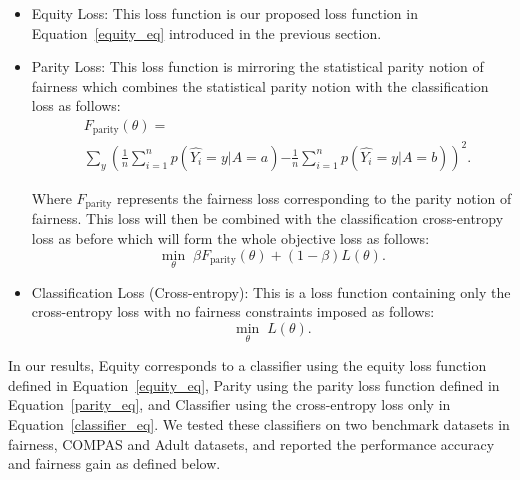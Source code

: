 \begin{itemize}
    \item Equity Loss: This loss function is our proposed loss function in Equation~\ref{equity_eq} introduced in the previous section.
    \item Parity Loss: This loss function is mirroring the statistical parity notion of fairness which combines the statistical parity notion with the classification loss as follows: 
    \begin{align*}
    &F_\text{parity}(\theta)=\\
    &\sum_{y}\left(\frac{1}{n}\sum_{i=1}^{n}p(\hat{Y_i}=y|A=a) \right. 
    \left.-\frac{1}{n}\sum_{i=1}^{n}p(\hat{Y_i}=y|A=b)\right)^2.
    \end{align*}

    Where $F_\text{parity}$ represents the fairness loss corresponding to the parity notion of fairness. This loss will then be combined with the classification cross-entropy loss as before which will form the whole objective loss as follows:
    \begin{equation}
     \min_\theta \; \beta F_\text{parity}(\theta)+ (1-\beta)L(\theta).
     \label{parity_eq}
    \end{equation}
    \item Classification Loss (Cross-entropy):  This is a loss function containing only the cross-entropy loss with no fairness constraints imposed as follows:
    \begin{equation}
     \min_\theta \; L(\theta).
     \label{classifier_eq}
    \end{equation}
\end{itemize}
In our results, Equity corresponds to a classifier using the equity loss function defined in Equation~\ref{equity_eq}, Parity using the parity loss function defined in Equation~\ref{parity_eq}, and Classifier using the cross-entropy loss only in Equation~\ref{classifier_eq}. We tested these classifiers on two benchmark datasets in fairness, COMPAS and Adult datasets, and reported the performance accuracy and fairness gain as defined below. \\
